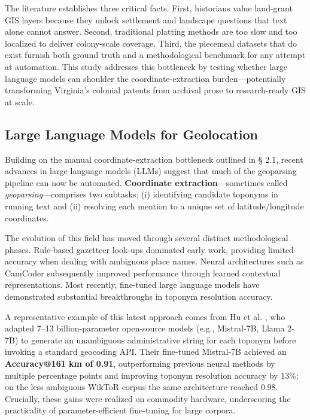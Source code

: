 The literature establishes three critical facts. First, historians value
land-grant GIS layers because they unlock settlement and landscape
questions that text alone cannot answer. Second, traditional platting
methods are too slow and too localized to deliver colony-scale coverage.
Third, the piecemeal datasets that do exist furnish both ground truth
and a methodological benchmark for any attempt at automation. This study
addresses this bottleneck by testing whether large language models can
shoulder the coordinate-extraction burden---potentially transforming
Virginia's colonial patents from archival prose to research-ready GIS at
scale.

\subsection{Large Language Models for
Geolocation}\label{large-language-models-for-geolocation}

Building on the manual coordinate-extraction bottleneck outlined in §
2.1, recent advances in large language models (LLMs) suggest that much
of the geoparsing pipeline can now be automated. \textbf{Coordinate
extraction}---sometimes called \emph{geoparsing}---comprises two
subtasks: (i) identifying candidate toponyms in running text and (ii)
resolving each mention to a unique set of latitude/longitude
coordinates.

The evolution of this field has moved through several distinct
methodological phases. Rule-based gazetteer look-ups dominated early
work, providing limited accuracy when dealing with ambiguous place
names. Neural architectures such as CamCoder \citep{Gritta2018_camcoder}
subsequently improved performance through learned contextual
representations. Most recently, fine-tuned large language models have
demonstrated substantial breakthroughs in toponym resolution accuracy.

A representative example of this latest approach comes from Hu et al.
\citep{Hu2024_toponym_llm}, who adapted 7--13 billion-parameter
open-source models (e.g., Mistral-7B, Llama 2-7B) to generate an
unambiguous administrative string for each toponym before invoking a
standard geocoding API. Their fine-tuned Mistral-7B achieved an
\textbf{Accuracy@161 km of 0.91}, outperforming previous neural methods
by multiple percentage points and improving toponym resolution accuracy
by 13\%; on the less ambiguous WikToR corpus the same architecture
reached 0.98. Crucially, these gains were realized on commodity
hardware, underscoring the practicality of parameter-efficient
fine-tuning for large corpora.


